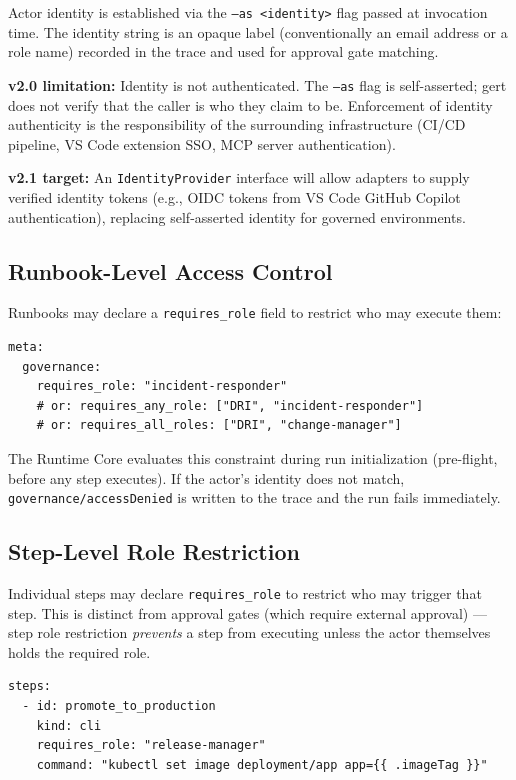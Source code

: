 Actor identity is established via the \texttt{--as <identity>} flag passed at invocation time.
The identity string is an opaque label (conventionally an email address or a role name) recorded
in the trace and used for approval gate matching.

\textbf{v2.0 limitation:} Identity is not authenticated. The \texttt{--as} flag is
self-asserted; gert does not verify that the caller is who they claim to be. Enforcement
of identity authenticity is the responsibility of the surrounding infrastructure (CI/CD
pipeline, VS Code extension SSO, MCP server authentication).

\textbf{v2.1 target:} An \texttt{IdentityProvider} interface will allow adapters to supply
verified identity tokens (e.g., OIDC tokens from VS Code GitHub Copilot authentication),
replacing self-asserted identity for governed environments.

\subsection{Runbook-Level Access Control}

Runbooks may declare a \texttt{requires\_role} field to restrict who may execute them:

\begin{verbatim}
meta:
  governance:
    requires_role: "incident-responder"
    # or: requires_any_role: ["DRI", "incident-responder"]
    # or: requires_all_roles: ["DRI", "change-manager"]
\end{verbatim}

The Runtime Core evaluates this constraint during run initialization (pre-flight, before
any step executes). If the actor's identity does not match, \texttt{governance/accessDenied}
is written to the trace and the run fails immediately.

\subsection{Step-Level Role Restriction}

Individual steps may declare \texttt{requires\_role} to restrict who may trigger that step.
This is distinct from approval gates (which require external approval) — step role restriction
\emph{prevents} a step from executing unless the actor themselves holds the required role.

\begin{verbatim}
steps:
  - id: promote_to_production
    kind: cli
    requires_role: "release-manager"
    command: "kubectl set image deployment/app app={{ .imageTag }}"
\end{verbatim}

